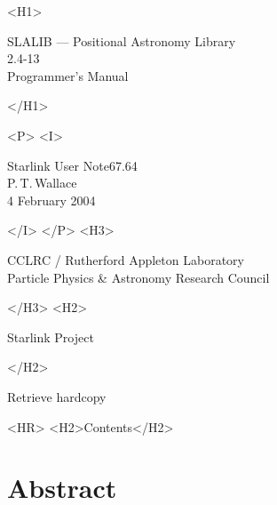 \documentclass[11pt,twoside]{article}
\newcommand{\stardoccategory}  {Starlink User Note}
\newcommand{\stardocsource}    {sun67.64}
\newcommand{\stardocnumber}    {67.64}
\newcommand{\stardocauthors}   {P.\,T.\,Wallace}
\newcommand{\stardocdate}      {4 February 2004}
\newcommand{\stardoctitle}     {SLALIB --- Positional Astronomy Library}
\newcommand{\stardocversion}   {2.4-13}
\newcommand{\stardocmanual}    {Programmer's Manual}
\newcommand{\htmladdnormallink}[2]{#1}
\newcommand{\htmladdimg}[1]{}
\newcommand{\htmlref}[2]{#1}
\newcommand{\htmladdtonavigation}[1]{}
\newcommand{\xlabel}[1]{}
\newcommand{\latexonlytoc}[0]{\tableofcontents}
\begin{document}
\begin{htmlonly}
   \xlabel{}
   \begin{rawhtml} <H1> \end{rawhtml}
      \stardoctitle\\
      \stardocversion\\
      \stardocmanual
   \begin{rawhtml} </H1> \end{rawhtml}


   \begin{rawhtml} <P> <I> \end{rawhtml}
   \stardoccategory \stardocnumber \\
   \stardocauthors \\
   \stardocdate
   \begin{rawhtml} </I> </P> <H3> \end{rawhtml}
      \htmladdnormallink{CCLRC}{http://www.cclrc.ac.uk} /
      \htmladdnormallink{Rutherford Appleton Laboratory}
                        {http://www.cclrc.ac.uk} \\
      \htmladdnormallink{Particle Physics \& Astronomy Research Council}
                        {http://www.pparc.ac.uk} \\
   \begin{rawhtml} </H3> <H2> \end{rawhtml}
      \htmladdnormallink{Starlink Project}{http://star-www.rl.ac.uk/}
   \begin{rawhtml} </H2> \end{rawhtml}
   \htmladdnormallink{\htmladdimg{source.gif} Retrieve hardcopy}
      {http://star-www.rl.ac.uk/cgi-bin/hcserver?\stardocsource}\\

  \label{stardoccontents}
  \begin{rawhtml}
    <HR>
    <H2>Contents</H2>
  \end{rawhtml}
  \renewcommand{\latexonlytoc}[0]{}
  \htmladdtonavigation{\htmlref{\htmladdimg{contents_motif.gif}}
        {stardoccontents}}

  \section{\xlabel{abstract}Abstract}
\end{htmlonly}
\end{document}
